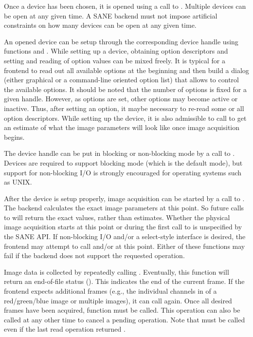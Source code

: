 \documentclass[11pt,DVIps]{report}
\begin{document}
Once a device has been chosen, it is opened using a call to
.  Multiple devices can be open at any given time.
A SANE backend must not impose artificial constraints on how many
devices can be open at any given time.

An opened device can be setup through the corresponding device handle
using functions  and
.  While setting up a device, obtaining
option descriptors and setting and reading of option values can be
mixed freely.  It is typical for a frontend to read out all available
options at the beginning and then build a dialog (either graphical or
a command-line oriented option list) that allows to control the
available options.  It should be noted that the number of options is
fixed for a given handle.  However, as options are set, other options
may become active or inactive.  Thus, after setting an option, it
maybe necessary to re-read some or all option descriptors.  While
setting up the device, it is also admissible to call
 to get an estimate of what the image
parameters will look like once image acquisition begins.

The device handle can be put in blocking or non-blocking mode by a
call to .  Devices are required to support
blocking mode (which is the default mode), but support for
non-blocking I/O is strongly encouraged for operating systems such as
UNIX.

After the device is setup properly, image acquisition can be started
by a call to .  The backend calculates the exact
image parameters at this point.  So future calls to
 will return the exact values, rather
than estimates.  Whether the physical image acquisition starts at this
point or during the first call to  is unspecified
by the SANE API.  If non-blocking I/O and/or a select-style interface
is desired, the frontend may attempt to call
 and/or  at
this point.  Either of these functions may fail if the backend does
not support the requested operation.

Image data is collected by repeatedly calling .
Eventually, this function will return an end-of-file status
().  This indicates the end of the current
frame.  If the frontend expects additional frames (e.g., the
individual channels in of a red/green/blue image or multiple images),
it can call  again.  Once all desired frames have
been acquired, function  must be called.  This
operation can also be called at any other time to cancel a pending
operation.  Note that  must be called even if the
last read operation returned .
\end{document}
